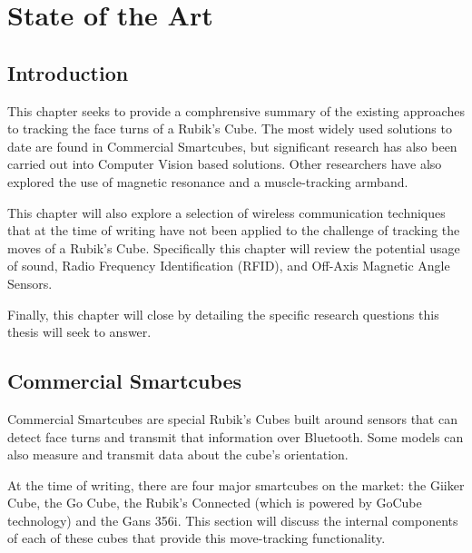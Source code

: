
\chapter{State of the Art} %

\label{Chapter3} %


\section{Introduction}

This chapter seeks to provide a comphrensive summary of the existing approaches to tracking the face turns of a Rubik's Cube.
The most widely used solutions to date are found in Commercial Smartcubes, but significant research has also been carried out into Computer Vision based solutions.
Other researchers have also explored the use of magnetic resonance and a muscle-tracking armband.

This chapter will also explore a selection of wireless communication techniques that at the time of writing have not been applied to the challenge of tracking the moves of a Rubik's Cube.
Specifically this chapter will review the potential usage of sound, Radio Frequency Identification (RFID), and Off-Axis Magnetic Angle Sensors.

Finally, this chapter will close by detailing the specific research questions this thesis will seek to answer.


\section{Commercial Smartcubes}

Commercial Smartcubes are special Rubik's Cubes built around sensors that can detect face turns and transmit that information over Bluetooth.
Some models can also measure and transmit data about the cube's orientation.

At the time of writing, there are four major smartcubes on the market: the Giiker Cube, the Go Cube, the Rubik's Connected (which is powered by GoCube technology) and the Gans 356i.
This section will discuss the internal components of each of these cubes that provide this move-tracking functionality.

